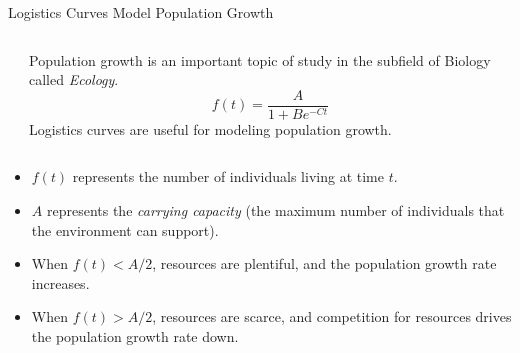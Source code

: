 \documentclass[10pt,aspectratio=1610,xcolor={dvipsnames}]{beamer}
\begin{document}
  \begin{frame}{Logistics Curves Model Population Growth}

    \begin{columns}

      \begin{center}
        \scalebox{0.65}{}
      \end{center}

      \begin{center}
        Population growth is an important topic of study in the subfield of Biology called \emph{Ecology}.
        \[
          f(t) = \frac{A}{1 + Be^{-Ct}}
        \]
        Logistics curves are useful for modeling population growth.
      \end{center}

    \end{columns}

    \begin{itemize}
      \item{$f(t)$ represents the number of individuals living at time $t$.}
      \item{$A$ represents the \emph{carrying capacity} (the maximum number of individuals that the environment can support).}
      \item{When $f(t) < A / 2$, resources are plentiful, and the population growth rate increases.}
      \item{When $f(t) > A / 2$, resources are scarce, and competition for resources drives the population growth rate down.}
    \end{itemize}

  \end{frame}
\end{document}
